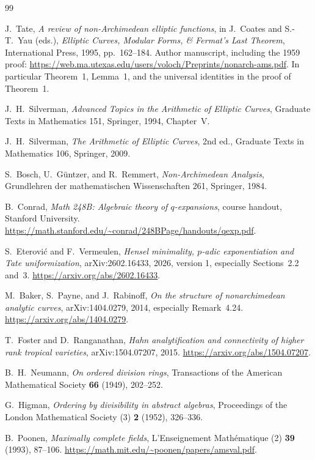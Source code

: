 \documentclass[11pt,letterpaper]{article}
\theoremstyle{definition}
\begin{document}
\begin{thebibliography}{99}\small

J.~Tate,
\emph{A review of non-Archimedean elliptic functions},
in J.~Coates and S.-T.~Yau (eds.),
\emph{Elliptic Curves, Modular Forms, \& Fermat's Last Theorem},
International Press, 1995, pp.~162--184.
Author manuscript, including the 1959 proof:
\url{https://web.ma.utexas.edu/users/voloch/Preprints/nonarch-ams.pdf}.
In particular Theorem~1, Lemma~1, and the universal identities in the proof
of Theorem~1.

J.~H.~Silverman,
\emph{Advanced Topics in the Arithmetic of Elliptic Curves},
Graduate Texts in Mathematics 151, Springer, 1994, Chapter~V.

J.~H.~Silverman,
\emph{The Arithmetic of Elliptic Curves},
2nd ed., Graduate Texts in Mathematics 106, Springer, 2009.

S.~Bosch, U.~G\"untzer, and R.~Remmert,
\emph{Non-Archimedean Analysis}, Grundlehren der mathematischen
Wissenschaften 261, Springer, 1984.

B.~Conrad,
\emph{Math 248B: Algebraic theory of $q$-expansions}, course handout,
Stanford University.
\url{https://math.stanford.edu/~conrad/248BPage/handouts/qexp.pdf}.

S.~Eterovi\'c and F.~Vermeulen,
\emph{Hensel minimality, $p$-adic exponentiation and Tate uniformization},
arXiv:2602.16433, 2026, version 1, especially Sections~2.2 and~3.
\url{https://arxiv.org/abs/2602.16433}.

M.~Baker, S.~Payne, and J.~Rabinoff,
\emph{On the structure of nonarchimedean analytic curves},
arXiv:1404.0279, 2014, especially Remark~4.24.
\url{https://arxiv.org/abs/1404.0279}.

T.~Foster and D.~Ranganathan,
\emph{Hahn analytification and connectivity of higher rank tropical
varieties}, arXiv:1504.07207, 2015.
\url{https://arxiv.org/abs/1504.07207}.

B.~H.~Neumann,
\emph{On ordered division rings},
Transactions of the American Mathematical Society \textbf{66} (1949),
202--252.

G.~Higman,
\emph{Ordering by divisibility in abstract algebras},
Proceedings of the London Mathematical Society (3) \textbf{2} (1952),
326--336.

B.~Poonen,
\emph{Maximally complete fields},
L'Enseignement Math\'ematique (2) \textbf{39} (1993), 87--106.
\url{https://math.mit.edu/~poonen/papers/amsval.pdf}.


\end{thebibliography}
\end{document}

